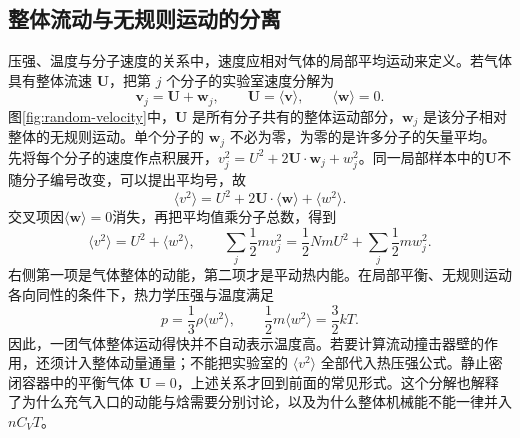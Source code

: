 \subsection{整体流动与无规则运动的分离}
压强、温度与分子速度的关系中，速度应相对气体的局部平均运动来定义。若气体具有整体流速 $\bm U$，把第 $j$ 个分子的实验室速度分解为
\[
 \bm v_j=\bm U+\bm w_j,\qquad
 \bm U=\langle\bm v\rangle,\qquad\langle\bm w\rangle=0.
\]
图\ref{fig:random-velocity}中，$\bm U$ 是所有分子共有的整体运动部分，$\bm w_j$ 是该分子相对整体的无规则运动。单个分子的 $\bm w_j$ 不必为零，为零的是许多分子的矢量平均。
先将每个分子的速度作点积展开，$v_j^2=U^2+2\bm U\cdot\bm w_j+w_j^2$。同一局部样本中的$\bm U$不随分子编号改变，可以提出平均号，故
\[
\langle v^2\rangle
=U^2+2\bm U\cdot\langle\bm w\rangle+\langle w^2\rangle.
\]
交叉项因$\langle\bm w\rangle=0$消失，再把平均值乘分子总数，得到
\[
 \langle v^2\rangle=U^2+\langle w^2\rangle,\qquad
 \sum_j\frac12mv_j^2=\frac12NmU^2+\sum_j\frac12mw_j^2.
\]
右侧第一项是气体整体的动能，第二项才是平动热内能。在局部平衡、无规则运动各向同性的条件下，热力学压强与温度满足
\[
 p=\frac13\rho\langle w^2\rangle,\qquad
 \frac12m\langle w^2\rangle=\frac32kT.
\]
因此，一团气体整体运动得快并不自动表示温度高。若要计算流动撞击器壁的作用，还须计入整体动量通量；不能把实验室的 $\langle v^2\rangle$ 全部代入热压强公式。静止密闭容器中的平衡气体 $\bm U=0$，上述关系才回到前面的常见形式。这个分解也解释了为什么充气入口的动能与焓需要分别讨论，以及为什么整体机械能不能一律并入 $nC_VT$。
